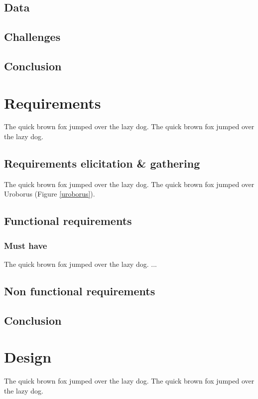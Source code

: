 \documentclass{l4proj}
\begin{document}
\section{Data}

\section{Challenges}

\section{Conclusion}

\chapter{Requirements}
The quick brown fox jumped over the lazy dog.
The quick brown fox jumped over the lazy dog.

\section{Requirements elicitation \& gathering}
The quick brown fox jumped over the lazy dog.
The quick brown fox jumped over Uroborus (Figure \ref{uroborus}).

\section{Functional requirements}

\subsection{Must have}
The quick brown fox jumped over the lazy dog.
...

\section{Non functional requirements}

\section{Conclusion}

\chapter{Design}
The quick brown fox jumped over the lazy dog.
The quick brown fox jumped over the lazy dog.
\end{document}
